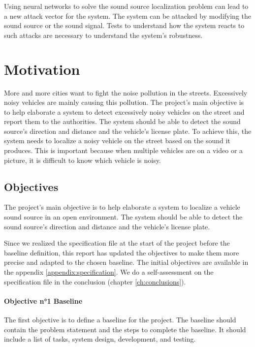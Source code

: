 Using neural networks to solve the sound source localization problem can lead to a new attack vector for the system. The system can be attacked by modifying the sound source or the sound signal. Tests to understand how the system reacts to such attacks are necessary to understand the system's robustness.

\section{Motivation}
\label{intro:motivation}

More and more cities want to fight the noise pollution in the streets. Excessively noisy vehicles are mainly causing this pollution.
The project's main objective is to help elaborate a system to detect excessively noisy vehicles on the street and report them to the authorities. The system should be able to detect the sound source's direction and distance and the vehicle's license plate. To achieve this, the system needs to localize a noisy vehicle on the street based on the sound it produces. This is important because when multiple vehicles are on a video or a picture, it is difficult to know which vehicle is noisy.

\subsection{Objectives}
The project's main objective is to help elaborate a system to localize a vehicle sound source in an open environment. The system should be able to detect the sound source's direction and distance and the vehicle's license plate.

Since we realized the specification file at the start of the project before the baseline definition, this report has updated the objectives to make them more precise and adapted to the chosen baseline. The initial objectives are available in the appendix \ref{appendix:specification}. We do a self-assessment on the specification file in the conclusion (chapter \ref{ch:conclusions}).

\paragraph{Objective n°1 Baseline}
\label{intro:objective1}

The first objective is to define a baseline for the project. The baseline should contain the problem statement and the steps to complete the baseline. It should include a list of tasks, system design, development, and testing. 

